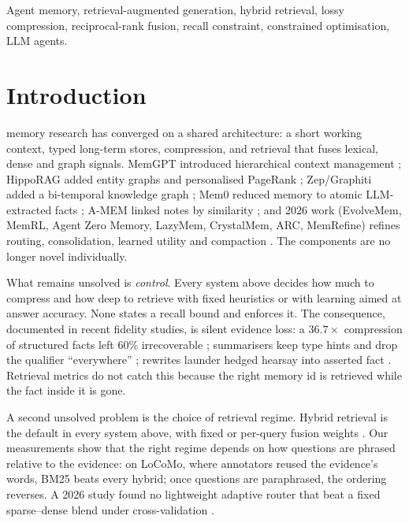 \documentclass[journal]{IEEEtran}
\begin{document}
\begin{abstract}
between a learned embedder and the controller's calibration split.
\end{abstract}

\begin{IEEEkeywords}
Agent memory, retrieval-augmented generation, hybrid retrieval, lossy compression, reciprocal-rank fusion, recall constraint, constrained optimisation, LLM agents.
\end{IEEEkeywords}

\IEEEpeerreviewmaketitle

\section{Introduction}
 memory research has converged on a shared architecture: a short working context, typed long-term stores, compression, and retrieval that fuses lexical, dense and graph signals. MemGPT introduced hierarchical context management \cite{memgpt}; HippoRAG added entity graphs and personalised PageRank \cite{hipporag}; Zep/Graphiti added a bi-temporal knowledge graph \cite{zep}; Mem0 reduced memory to atomic LLM-extracted facts \cite{mem0}; A-MEM linked notes by similarity \cite{amem}; and 2026 work (EvolveMem, MemRL, Agent Zero Memory, LazyMem, CrystalMem, ARC, MemRefine) refines routing, consolidation, learned utility and compaction \cite{evolvemem,memrl,agentzero,lazymem,crystalmem,arc,memrefine}. The components are no longer novel individually.

What remains unsolved is \emph{control}. Every system above decides how much to compress and how deep to retrieve with fixed heuristics or with learning aimed at answer accuracy. None states a recall bound and enforces it. The consequence, documented in recent fidelity studies, is silent evidence loss: a $36.7\times$ compression of structured facts left 60\% irrecoverable \cite{facts}; summarisers keep type hints and drop the qualifier ``everywhere'' \cite{fidelity}; rewrites launder hedged hearsay into asserted fact \cite{factwash}. Retrieval metrics do not catch this because the right memory id is retrieved while the fact inside it is gone.

A second unsolved problem is the choice of retrieval regime. Hybrid retrieval is the default in every system above, with fixed or per-query fusion weights \cite{tfusion,wrrf,vstash}. Our measurements show that the right regime depends on how questions are phrased relative to the evidence: on LoCoMo, where annotators reused the evidence's words, BM25 beats every hybrid; once questions are paraphrased, the ordering reverses. A 2026 study found no lightweight adaptive router that beat a fixed sparse--dense blend under cross-validation \cite{fairness}.
\end{document}
